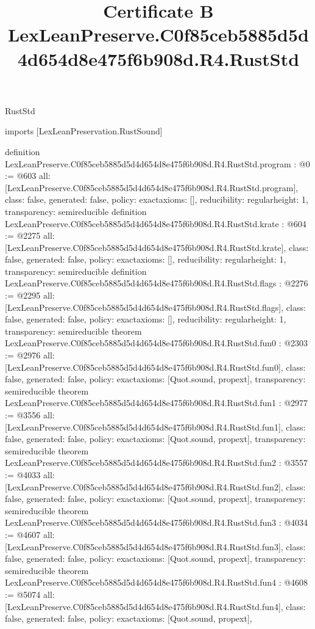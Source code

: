 \begin{lexlean}{RustStd}
\title{Certificate B LexLeanPreserve.C0f85ceb5885d5d4d654d8e475f6b908d.R4.RustStd}
\begin{coremodule}
imports [LexLeanPreservation.RustSound]

definition LexLeanPreserve.C0f85ceb5885d5d4d654d8e475f6b908d.R4.RustStd.program : @0 := @603 {
  all: [LexLeanPreserve.C0f85ceb5885d5d4d654d8e475f6b908d.R4.RustStd.program],
  class: false,
  generated: false,
  policy: exact{axioms: []},
  reducibility: regular{height: 1},
  transparency: semireducible
}
definition LexLeanPreserve.C0f85ceb5885d5d4d654d8e475f6b908d.R4.RustStd.krate : @604 := @2275 {
  all: [LexLeanPreserve.C0f85ceb5885d5d4d654d8e475f6b908d.R4.RustStd.krate],
  class: false,
  generated: false,
  policy: exact{axioms: []},
  reducibility: regular{height: 1},
  transparency: semireducible
}
definition LexLeanPreserve.C0f85ceb5885d5d4d654d8e475f6b908d.R4.RustStd.flags : @2276 := @2295 {
  all: [LexLeanPreserve.C0f85ceb5885d5d4d654d8e475f6b908d.R4.RustStd.flags],
  class: false,
  generated: false,
  policy: exact{axioms: []},
  reducibility: regular{height: 1},
  transparency: semireducible
}
theorem LexLeanPreserve.C0f85ceb5885d5d4d654d8e475f6b908d.R4.RustStd.fun0 : @2303 := @2976 {
  all: [LexLeanPreserve.C0f85ceb5885d5d4d654d8e475f6b908d.R4.RustStd.fun0],
  class: false,
  generated: false,
  policy: exact{axioms: [Quot.sound, propext]},
  transparency: semireducible
}
theorem LexLeanPreserve.C0f85ceb5885d5d4d654d8e475f6b908d.R4.RustStd.fun1 : @2977 := @3556 {
  all: [LexLeanPreserve.C0f85ceb5885d5d4d654d8e475f6b908d.R4.RustStd.fun1],
  class: false,
  generated: false,
  policy: exact{axioms: [Quot.sound, propext]},
  transparency: semireducible
}
theorem LexLeanPreserve.C0f85ceb5885d5d4d654d8e475f6b908d.R4.RustStd.fun2 : @3557 := @4033 {
  all: [LexLeanPreserve.C0f85ceb5885d5d4d654d8e475f6b908d.R4.RustStd.fun2],
  class: false,
  generated: false,
  policy: exact{axioms: [Quot.sound, propext]},
  transparency: semireducible
}
theorem LexLeanPreserve.C0f85ceb5885d5d4d654d8e475f6b908d.R4.RustStd.fun3 : @4034 := @4607 {
  all: [LexLeanPreserve.C0f85ceb5885d5d4d654d8e475f6b908d.R4.RustStd.fun3],
  class: false,
  generated: false,
  policy: exact{axioms: [Quot.sound, propext]},
  transparency: semireducible
}
theorem LexLeanPreserve.C0f85ceb5885d5d4d654d8e475f6b908d.R4.RustStd.fun4 : @4608 := @5074 {
  all: [LexLeanPreserve.C0f85ceb5885d5d4d654d8e475f6b908d.R4.RustStd.fun4],
  class: false,
  generated: false,
  policy: exact{axioms: [Quot.sound, propext]},
}
\end{coremodule}
\end{lexlean}
